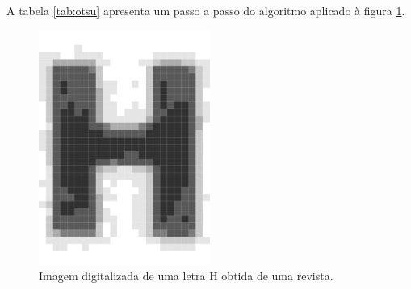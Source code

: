 \documentclass[a4paper,11pt]{article}
\begin{document}
      A tabela \ref{tab:otsu} apresenta um passo a passo do algoritmo aplicado à figura \ref{fig:letrah}.

      \begin{figure}[htb]
        \begin{center}
          \includegraphics[width=0.5\textwidth]{assets/binarization/h_3grayscale_big.png}
          \end{center}
        \caption{Imagem digitalizada de uma letra H obtida de uma revista.}
        \label{fig:letrah}
      \end{figure}
\end{document}
